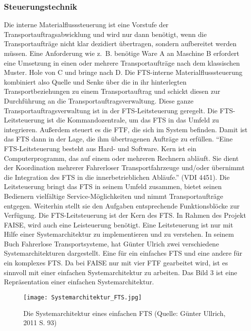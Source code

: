 \subsubsection{Steuerungstechnik}
Die interne Materialflusssteuerung ist eine Vorstufe der Transportauftragsabwicklung und wird nur dann ben\"otigt, 
wenn die Transportauftr\"age nicht klar dezidiert \"ubertragen, sondern aufbereitet werden m\"ussen.
Eine Anforderung wie z.~B. ben\"otige Ware A an Maschine B erfordert eine Umsetzung in einen oder mehrere Transportauftr\"age nach dem klassischen Muster.
Hole von C und bringe nach D.
Die FTS-interne Materialflusssteuerung kombiniert also Quelle und Senke \"uber die in ihr hinterlegten Transportbeziehungen 
zu einem Transportauftrag und schickt diesen zur Durchf\"uhrung an die Transportauftragsverwaltung.
Diese ganze Transportauftragsverwaltung ist in der FTS-Leitsteuerung geregelt. 
Die FTS-Leitsteuerung ist die Kommandozentrale, um das FTS in das Umfeld zu integrieren.
Au\ss erdem steuert es die FTF, die sich im System befinden.
Damit ist das FTS dann in der Lage, die ihm \"ubertragenen Auftr\"age zu erf\"ullen.
"`Eine FTS-Leitsteuerung besteht aus Hard- und Software.
Kern ist ein Computerprogramm, das auf einem oder mehreren Rechnern abl\"auft.
Sie dient der Koordination mehrerer Fahrerloser Transportfahrzeuge und/oder \"ubernimmt die Integration des FTS in die innerbetrieblichen Abl\"aufe."' \cite{VDI:1994}(VDI 4451).
Die Leitsteuerung bringt das FTS in seinem Umfeld zusammen, bietet seinen Bedienern vielf\"altige Service-M\"oglichkeiten und nimmt Transportauftr\"age entgegen.
Weiterhin stellt sie den Aufgaben entsprechende Funktionsbl\"ocke zur Verf\"ugung. 
Die FTS-Leitsteuerung ist der Kern des FTS.
In Rahmen des Projekt FAISE, wird auch eine Leisteuerung ben\"otigt.
Eine Leitsteuerung ist nur mit Hilfe einer Systemarchitektur zu implementieren und zu verstehen.
In seinem Buch Fahrerlose Transportsysteme, hat G\"unter Ulrich zwei verschiedene Systemarchitekturen dargestellt.
Eine f\"ur ein einfaches FTS und eine andere f\"ur ein komplexes FTS.
Da bei FAISE nur mit vier FTF gearbeitet wird, ist es sinnvoll mit einer einfachen Systemarchitektur zu arbeiten.
Das Bild 3 ist eine Repr\"asentation einer einfachen Systemarchitektur.
	\begin{figure}[h!]
		\centering
		\texttt{[image: Systemarchitektur\_FTS.jpg]}
		\caption{Die Systemarchitektur eines einfachen FTS (Quelle: G\"unter Ullrich, 2011 S. 93)}
		\label{Systemarchitektur_FTS}
	\end{figure}

